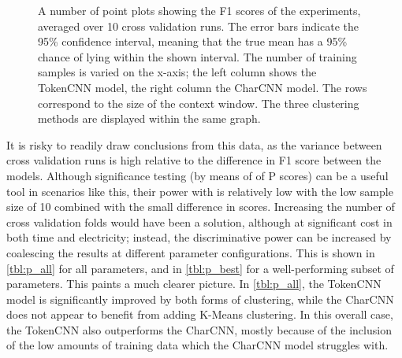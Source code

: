 \begin{figure}[tb]
  \centering
  \caption{A number of point plots showing the F1 scores of the experiments,
    averaged over 10 cross validation runs. The error bars indicate the 95\%
    confidence interval, meaning that the true mean has a 95\% chance of lying
    within the shown interval.  The number of training samples is varied on the
    x-axis; the left column shows the TokenCNN model, the right column the
    CharCNN model. The rows correspond to the size of the context window. The
    three clustering methods are displayed within the same
  graph.\label{fig:results}}
\end{figure}

It is risky to readily draw conclusions from this data, as the variance between
cross validation runs is high relative to the difference in F1 score between the
models. Although significance testing (by means of of P scores) can be a useful
tool in scenarios like this, their power with is relatively low with the low
sample size of 10 combined with the small difference in scores.  Increasing the
number of cross validation folds would have been a solution, although at
significant cost in both time and electricity; instead, the discriminative power
can be increased by coalescing the results at different parameter
configurations. This is shown in \cref{tbl:p_all} for all parameters, and in
\cref{tbl:p_best} for a well-performing subset of parameters. This paints a much
clearer picture. In \cref{tbl:p_all}, the TokenCNN model is significantly
improved by both forms of clustering, while the CharCNN does not appear to
benefit from adding K-Means clustering. In this overall case, the TokenCNN also
outperforms the CharCNN, mostly because of the inclusion of the low amounts of
training data which the CharCNN model struggles with.

